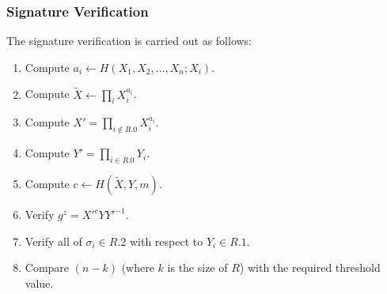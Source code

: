 \subsubsection{Signature Verification}
The signature verification is carried out as follows:
\begin{enumerate}
    \item Compute ${a_i\leftarrow H(X_1,X_2,\dots,X_n;X_i)}$.
    \item Compute ${\tilde{X}\leftarrow\prod_i X_i^{a_i}}$.
    \item Compute ${X' = \prod_{i\notin R.0}X_i^{a_i}}$.
    \item Compute ${Y' = \prod_{i\in R.0} Y_i}$.
    \item Compute ${c\leftarrow H(\tilde{X}, Y, m)}$.
    \item Verify ${g^z=X'^cYY'^{-1}}$.
    \item Verify all of ${\sigma_i\in R.2}$ with respect to ${Y_i\in R.1}$.
    \item Compare ${(n-k)}$ (where $k$ is the size of $R$) with the required threshold value.
\end{enumerate}